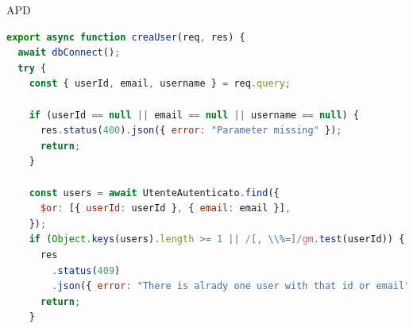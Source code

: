 \begin{listaPersonale} {APD}
\begin{listaPersonale2}[APD]{}

                \begin{lstlisting}[language=JavaScript]
export async function creaUser(req, res) {
  await dbConnect();
  try {
    const { userId, email, username } = req.query;

    if (userId == null || email == null || username == null) {
      res.status(400).json({ error: "Parameter missing" });
      return;
    }

    const users = await UtenteAutenticato.find({
      $or: [{ userId: userId }, { email: email }],
    });
    if (Object.keys(users).length >= 1 || /[, \\%=]/gm.test(userId)) {
      res
        .status(409)
        .json({ error: "There is alrady one user with that id or email" });
      return;
    }


\end{lstlisting}
\end{listaPersonale2}
\end{listaPersonale}
